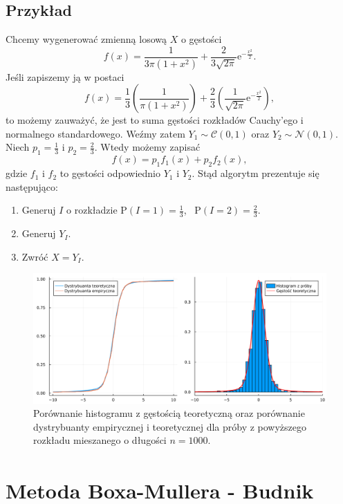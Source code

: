 \documentclass[12pt]{mwrep}
\begin{document}
	\subsection{Przykład}
	\noindent Chcemy wygenerować zmienną losową $X$ o gęstości
	$$ f(x) = \frac{1}{3\pi(1 + x^2)} + \frac{2}{3\sqrt{2\pi}}\mathrm{e}^{-\frac{x^2}{2}}. $$
	Jeśli zapiszemy ją w postaci
	$$ f(x) = \frac{1}{3}\left(\frac{1}{\pi(1 + x^2)} \right) + \frac{2}{3}\left(\frac{1}{\sqrt{2\pi}}\mathrm{e}^{-\frac{x^2}{2}}\right), $$
	to możemy zauważyć, że jest to suma gęstości rozkładów Cauchy'ego i normalnego standardowego. Weźmy zatem $Y_1 \sim \mathcal{C}(0, 1)$ oraz $Y_2 \sim \mathcal{N}(0, 1)$. Niech $p_1 = \frac{1}{3}$ i $p_2 = \frac{2}{3}$. Wtedy możemy zapisać
	$$ f(x) = p_1 f_1(x) + p_2 f_2(x), $$
	gdzie $f_1$ i $f_2$ to gęstości odpowiednio $Y_1$ i $Y_2$. Stąd algorytm prezentuje się następująco:
	\begin{enumerate}[leftmargin=10mm]
		\item Generuj $I$ o rozkładzie $\mathrm{P}(I = 1) = \frac{1}{3}$, \ $\mathrm{P}(I = 2) = \frac{2}{3}$.
		\item Generuj $Y_I$.
		\item Zwróć $X = Y_I$.
	\end{enumerate}
	\begin{figure}[H]
		\centering
		\caption{Porównanie histogramu z gęstością teoretyczną oraz porównanie dystrybuanty empirycznej i teoretycznej dla próby z powyższego rozkładu mieszanego o długości $n = 1000$.}
		\includegraphics[scale=0.1]{fig/fig_komp.png}
	\end{figure}



	
	\section{Metoda Boxa-M{u}llera\textsuperscript{\cite{box-kox}} - Budnik}
\end{document}
